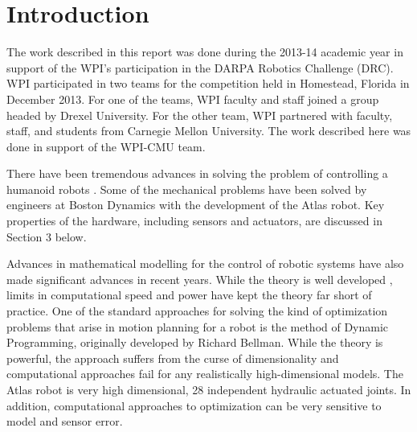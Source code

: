 \documentclass[12pt]{report}
\begin{document}
\newpage
\setcounter{page}{1}
\renewcommand{\thepage}{\roman{page}}
\pagestyle{plain}

\newpage
\tableofcontents
\newpage
\renewcommand{\thepage}{\arabic{page}}
\setcounter{page}{1}
\pagestyle{plain}
\chapter{Introduction}
The work described in this report was done during the 2013-14 academic year in support of the WPI’s participation in the DARPA Robotics Challenge (DRC). WPI participated in two teams for the competition held in Homestead, Florida in December 2013.  For one of the teams, WPI faculty and staff joined a group headed by Drexel University.  For the other team, WPI partnered with faculty, staff, and students from Carnegie Mellon University. The work described here was done in support of the WPI-CMU team.  

There have been tremendous advances in solving the problem of controlling a humanoid robots \cite{eric_thesis}. Some of the mechanical problems have been solved by engineers at Boston Dynamics with the development of the Atlas robot. Key properties of the hardware, including sensors and actuators, are discussed in Section 3 below. 

Advances in mathematical modelling for the control of robotic systems have also made significant advances in recent years.  While the theory is well developed \cite{Deterministic_and_Stochastic}, limits in computational speed and power have kept the theory far short of practice.  One of the standard approaches for solving  the kind of optimization problems that arise in motion planning for a robot is the method of Dynamic Programming, originally developed by Richard Bellman. \cite{Deterministic_and_Stochastic} While the theory is powerful, the approach suffers from the curse of dimensionality \cite{random_sampling_dynamic_programming} and computational approaches fail for any realistically high-dimensional models.  The Atlas robot is very high dimensional, 28 independent hydraulic actuated joints. In addition, computational approaches to optimization can be very sensitive to model and sensor error. 
\end{document}
